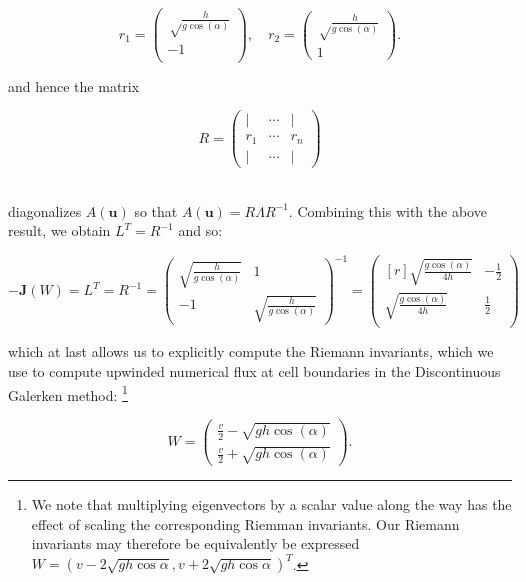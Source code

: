 $$
r_1 = \begin{pmatrix}
    \sqrt\frac{h}{g \cos{(\alpha)}} \\
    -1 \\
\end{pmatrix}, \quad r_2 = \begin{pmatrix}
    \sqrt\frac{h}{g \cos{(\alpha)}} \\
    1
\end{pmatrix}.
$$

\noindent and hence the matrix 

$$
R = \begin{pmatrix}
    \vert & \cdots & \vert \\
    r_1   & \cdots & r_n   \\
    \vert & \cdots & \vert
\end{pmatrix}
$$

\ \\
\noindent diagonalizes $A(\textbf{u})$ so that $A(\textbf{u}) = R \Lambda R^{-1}$. Combining this with the above result,
we obtain $L^T = R^{-1}$ and so:

\[\renewcommand\arraystretch{2}
-\textbf{J}(W) = L^T = R^{-1} = \begin{pmatrix}
    \sqrt{\frac{h}{g \cos{(\alpha)}}} & 1 \\
    -1                                & \sqrt{\frac{h}{g \cos{(\alpha)}}}
\end{pmatrix}^{-1} = \begin{pmatrix*}[r]
    \sqrt{\frac{g \cos{(\alpha)}}{4h}} & -\frac{1}{2} \\
    \sqrt{\frac{g \cos{(\alpha)}}{4h}} &  \frac{1}{2} \\
\end{pmatrix*}
\]

\pagebreak

\noindent which at last allows us to explicitly compute the Riemann invariants, which we use to compute upwinded 
numerical flux at cell boundaries in the Discontinuous Galerken method: \footnote{
    We note that multiplying eigenvectors by a scalar value along the way has the effect of scaling the corresponding 
    Riemman invariants. Our Riemann invariants may therefore be equivalently be expressed \linebreak
    $W = (v - 2 \sqrt{gh \cos{\alpha}}, v + 2 \sqrt{gh \cos{\alpha}})^T$.
}

\[\renewcommand\arraystretch{2}
W = \begin{pmatrix}
    \frac{v}{2} - \sqrt{g h \cos{(\alpha)}} \\ 
    \frac{v}{2} + \sqrt{g h \cos{(\alpha)}} 
\end{pmatrix}.
\]
